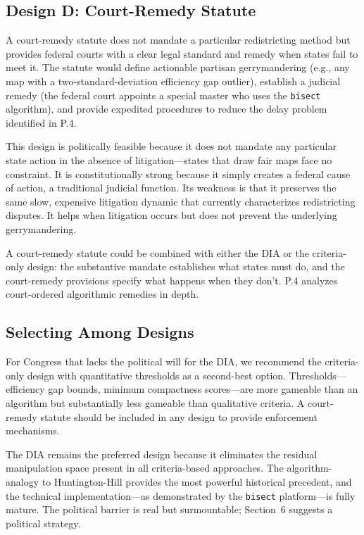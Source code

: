 \subsection{Design D: Court-Remedy Statute}

A court-remedy statute does not mandate a particular redistricting method but provides federal courts with a clear legal standard and remedy when states fail to meet it. The statute would define actionable partisan gerrymandering (e.g., any map with a two-standard-deviation efficiency gap outlier), establish a judicial remedy (the federal court appoints a special master who uses the \texttt{bisect} algorithm), and provide expedited procedures to reduce the delay problem identified in P.4.

This design is politically feasible because it does not mandate any particular state action in the absence of litigation---states that draw fair maps face no constraint. It is constitutionally strong because it simply creates a federal cause of action, a traditional judicial function. Its weakness is that it preserves the same slow, expensive litigation dynamic that currently characterizes redistricting disputes. It helps when litigation occurs but does not prevent the underlying gerrymandering.

A court-remedy statute could be combined with either the DIA or the criteria-only design: the substantive mandate establishes what states must do, and the court-remedy provisions specify what happens when they don't. P.4 analyzes court-ordered algorithmic remedies in depth.

\subsection{Selecting Among Designs}

For Congress that lacks the political will for the DIA, we recommend the criteria-only design with quantitative thresholds as a second-best option. Thresholds---efficiency gap bounds, minimum compactness scores---are more gameable than an algorithm but substantially less gameable than qualitative criteria. A court-remedy statute should be included in any design to provide enforcement mechanisms.

The DIA remains the preferred design because it eliminates the residual manipulation space present in all criteria-based approaches. The algorithm-analogy to Huntington-Hill provides the most powerful historical precedent, and the technical implementation---as demonstrated by the \texttt{bisect} platform---is fully mature. The political barrier is real but surmountable; Section~6 suggests a political strategy.
